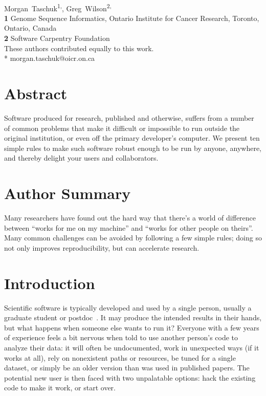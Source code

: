 \documentclass[10pt,letterpaper]{article}
\date{}
\begin{document}
\vspace*{0.2in}

\begin{flushleft}
{\Large
\textbf{}
}
\newline
\\
{Morgan~Taschuk}\textsuperscript{1,\ddag *},
{Greg~Wilson}\textsuperscript{2,\ddag}
\\
\bigskip
\textbf{1} Genome Sequence Informatics, Ontario Institute for Cancer Research, Toronto, Ontario, Canada
\\
\textbf{2} Software Carpentry Foundation
\\
\bigskip
{\ddag} These authors contributed equally to this work.
\\
* morgan.taschuk@oicr.on.ca
\end{flushleft}

\section*{Abstract}

Software produced for research, published and otherwise, suffers from
a number of common problems that make it difficult or impossible to
run outside the original institution, or even off the primary
developer's computer.  We present ten simple rules to make such
software robust enough to be run by anyone, anywhere, and thereby
delight your users and collaborators.

\section*{Author Summary}

Many researchers have found out the hard way that there's a world of
difference between ``works for me on my machine'' and ``works for
other people on theirs''.  Many common challenges can be avoided by
following a few simple rules; doing so not only improves
reproducibility, but can accelerate research.

\section*{Introduction}

Scientific software is typically developed and used by a single
person, usually a graduate student or postdoc~\cite{prins2015}.  It
may produce the intended results in their hands, but what happens when
someone else wants to run it? Everyone with a few years of experience
feels a bit nervous when told to use another person's code to analyze
their data: it will often be undocumented, work in unexpected ways (if
it works at all), rely on nonexistent paths or resources, be tuned for
a single dataset, or simply be an older version than was used in
published papers.  The potential new user is then faced with two
unpalatable options: hack the existing code to make it work, or start
over.
\end{document}
